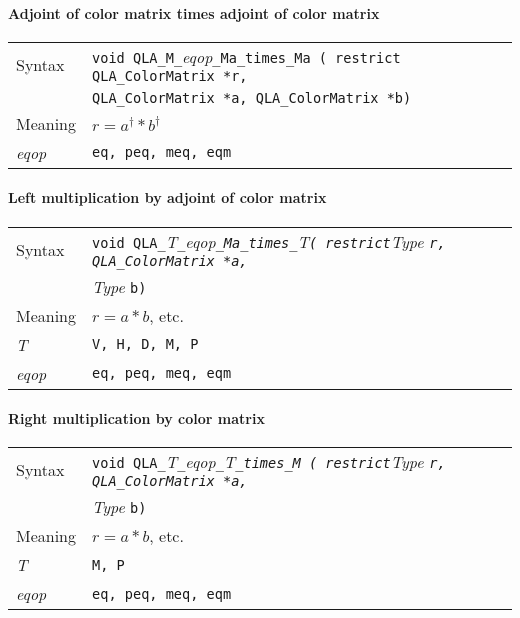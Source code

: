 \documentclass{article}
\newcommand{\tColorMatrix}{QLA\ttdash ColorMatrix }
\newcommand{\namespace}{QLA}
\newcommand{\allEqOps}{{\tt eq, peq, meq, eqm}}
\newcommand{\ttdash}{{\tt \_}}
\newcommand{\itt}{\it T}
\newcommand{\extraarg}{}
\newcommand{\shiftleftmult}{}
\newcommand{\shiftleftmultadj}{}
\begin{document}
\shiftleftmult

\paragraph{Adjoint of color matrix times adjoint of color matrix}

\begin{flushleft}
  \begin{tabular}{|l|l|}
  \hline
  Syntax      & {\tt void \namespace}\ttdash{\tt M}\ttdash{\it eqop}\ttdash{\tt Ma}\ttdash{\tt times}\ttdash{\tt Ma ( restrict \tColorMatrix *r, }\\
              & {\tt \tColorMatrix *a, \tColorMatrix *b\extraarg)} \\
  \hline
  Meaning     & $r = a^\dagger * b^\dagger$ \\
  \hline
  {\it eqop}  & \allEqOps \\
  \hline
  \end{tabular}
\end{flushleft}

\paragraph{Left multiplication by adjoint of color matrix}

\begin{flushleft}
  \begin{tabular}{|l|l|}
  \hline
  Syntax      & {\tt void \namespace}\ttdash\itt\ttdash{\it eqop}\ttdash{\tt Ma}\ttdash{\tt times}\ttdash\itt{\tt ( restrict}{\it Type }{\tt *r, \tColorMatrix *a, }\\
              & {\it Type }{\tt *b\extraarg)} \\
  \hline
  Meaning     & $r = a * b$, etc. \\
  \hline
  \itt        & {\tt V, H, D, M, P} \\
  \hline
  {\it eqop}  & \allEqOps \\
  \hline
  \end{tabular}
\end{flushleft}

\shiftleftmultadj

\paragraph{Right multiplication by color matrix}

\begin{flushleft}
  \begin{tabular}{|l|l|}
  \hline
  Syntax      & {\tt void \namespace}\ttdash\itt\ttdash{\it eqop}\ttdash\itt\ttdash{\tt times}\ttdash{\tt M ( restrict}{\it Type }{\tt *r, \tColorMatrix *a, }\\
              & {\it Type }{\tt *b\extraarg)} \\
  \hline
  Meaning     & $r = a * b$, etc. \\
  \hline
  \itt        & {\tt M, P} \\
  \hline
  {\it eqop}  & \allEqOps \\
  \hline
  \end{tabular}
\end{flushleft}
\end{document}
